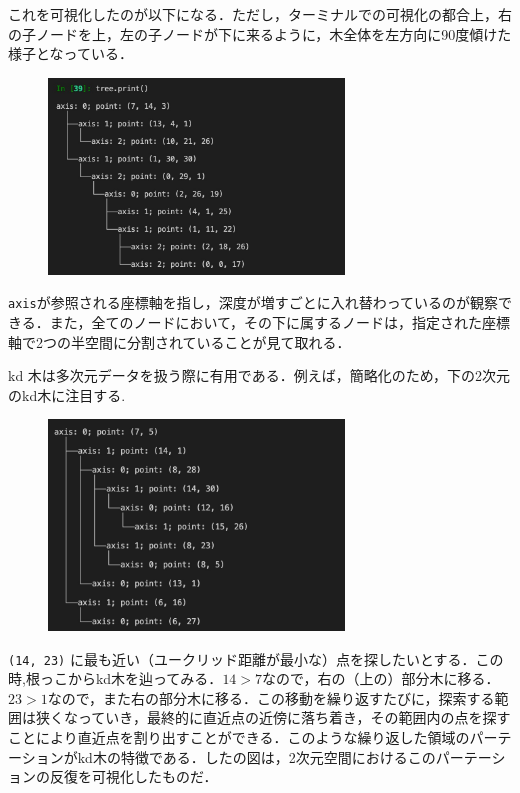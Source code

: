 \documentclass[
]{ltjarticle}
\begin{document}
これを可視化したのが以下になる．ただし，ターミナルでの可視化の都合上，右の子ノードを上，左の子ノードが下に来るように，木全体を左方向に90度傾けた様子となっている．

\begin{figure}
\centering
\includegraphics[width=0.7\textwidth]{kdtree.jpg}
\end{figure}

\texttt{axis}が参照される座標軸を指し，深度が増すごとに入れ替わっているのが観察できる．また，全てのノードにおいて，その下に属するノードは，指定された座標軸で2つの半空間に分割されていることが見て取れる．

kd
木は多次元データを扱う際に有用である．例えば，簡略化のため，下の2次元のkd木に注目する.

\begin{figure}
\centering
\includegraphics[width=0.7\textwidth]{tree2.jpg}
\end{figure}

\texttt{(14,\ 23)}
に最も近い（ユークリッド距離が最小な）点を探したいとする．この時,根っこからkd木を辿ってみる．\(14 >7\)なので，右の（上の）部分木に移る．\(23 > 1\)なので，また右の部分木に移る．この移動を繰り返すたびに，探索する範囲は狭くなっていき，最終的に直近点の近傍に落ち着き，その範囲内の点を探すことにより直近点を割り出すことができる．このような繰り返した領域のパーテーションがkd木の特徴である．したの図は，2次元空間におけるこのパーテーションの反復を可視化したものだ．
\end{document}
